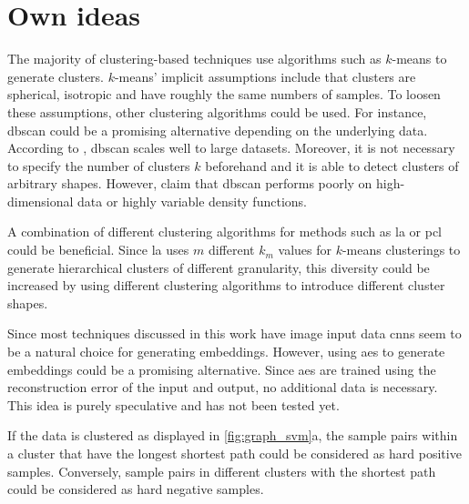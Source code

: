 \section{Own ideas}\label{sec:own_ideas}
\newcommand{\fisher}{Fisher's linear discriminant}

The majority of clustering-based techniques use algorithms such as $k$-means to generate clusters.
$k$-means' implicit assumptions include that clusters are spherical, isotropic and have roughly the same numbers of samples. %
To loosen these assumptions, other clustering algorithms could be used.
For instance, \ac{dbscan} could be a promising alternative depending on the underlying data.
According to \citet{local_aggr_2019}, \ac{dbscan} scales well to large datasets.
Moreover, it is not necessary to specify the number of clusters $k$ beforehand and 
it is able to detect clusters of arbitrary shapes.
However, \citeauthor{local_aggr_2019} claim that \ac{dbscan} performs poorly on 
high-dimensional data or highly variable density functions.

A combination of different clustering algorithms for methods such as 
\ac{la} \citet{local_aggr_2019} or \ac{pcl} \citet{PCL_2021} could be beneficial.
Since \ac{la} uses $m$ different $k_m$ values for $k$-means clusterings 
to generate hierarchical clusters of different granularity, 
this diversity could be increased by using different clustering algorithms to introduce different cluster shapes.

Since most techniques discussed in this work have image input data \acp{cnn} seem to be a natural choice for generating embeddings.
However, using \acp{ae} to generate embeddings could be a promising alternative.
Since \acp{ae} are trained using the reconstruction error of the input and output, no additional data is necessary.
This idea is purely speculative and has not been tested yet.

If the data is clustered as displayed in \autoref{fig:graph_svm}a,
the sample pairs within a cluster that have the longest shortest path could be considered as hard positive samples.
Conversely, sample pairs in different clusters with the shortest path could be considered as hard negative samples.

